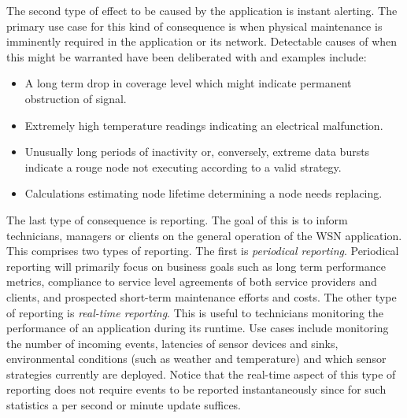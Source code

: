 The second type of effect to be caused by the application is instant alerting. The primary use case for this kind of consequence is when physical maintenance is imminently required in the application or its network. Detectable causes of when this might be warranted have been deliberated with \idsystems and examples include:
\begin{itemize}
\nospace
\item A long term drop in coverage level which might indicate permanent obstruction of signal.
\item Extremely high temperature readings indicating an electrical malfunction.
\item Unusually long periods of inactivity or, conversely, extreme data bursts indicate a rouge node not executing according to a valid strategy.
\item Calculations estimating node lifetime determining a node needs replacing.
\end{itemize}

The last type of consequence is reporting. The goal of this is to inform technicians, managers or clients on the general operation of the WSN application. This comprises two types of reporting. The first is \emph{periodical reporting}. Periodical reporting will primarily focus on business goals such as long term performance metrics, compliance to service level agreements of both service providers and clients, and prospected short-term maintenance efforts and costs. The other type of reporting is \emph{real-time reporting}. This is useful to technicians monitoring the performance of an application during its runtime. Use cases include monitoring the number of incoming events, latencies of sensor devices and sinks, environmental conditions (such as weather and temperature) and which sensor strategies currently are deployed. Notice that the real-time aspect of this type of reporting does not require events to be reported instantaneously since for such statistics a per second or minute update suffices.


